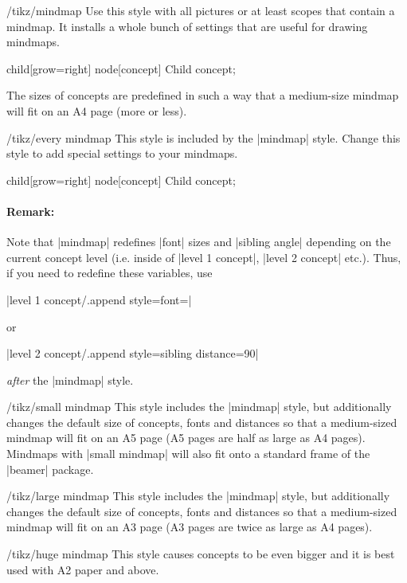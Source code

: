 \begin{stylekey}{/tikz/mindmap}
  Use this style with all pictures or at least scopes that contain a
  mindmap. It installs a whole bunch of settings that are useful for
  drawing mindmaps.
\begin{codeexample}[]
\tikz[mindmap,concept color=red!50]
    child[grow=right] {node[concept] {Child concept}};
\end{codeexample}
  The sizes of concepts are predefined in such a way that a
  medium-size mindmap will fit on an A4 page (more or less).
  \begin{stylekey}{/tikz/every mindmap}
    This style is included by the |mindmap| style. Change this style to
    add special settings to your mindmaps.
\begin{codeexample}[]
\tikz[large mindmap,concept color=red!50]
    child[grow=right] {node[concept] {Child concept}};
\end{codeexample}
  \end{stylekey}

  \paragraph{Remark:} Note that |mindmap| redefines |font| sizes and |sibling angle| depending on the current concept level (i.e. inside of |level 1 concept|, |level 2 concept| etc.). Thus, if you need to redefine these variables, use

  |level 1 concept/.append style={font=\small}|

  \noindent or

  |level 2 concept/.append style={sibling distance=90}|

  \noindent \emph{after} the |mindmap| style.
\end{stylekey}

\begin{stylekey}{/tikz/small mindmap}
  This style includes the |mindmap| style, but additionally changes
  the default size of concepts, fonts and distances so that a medium-sized
  mindmap will fit on an A5 page (A5 pages are half as large as A4
  pages). Mindmaps with |small mindmap| will also fit onto a standard frame of the |beamer| package.
\end{stylekey}
\begin{stylekey}{/tikz/large mindmap}
  This style includes the |mindmap| style, but additionally changes
  the default size of concepts, fonts and distances so that a medium-sized
  mindmap will fit on an A3 page (A3 pages are twice as large as A4
  pages).
\end{stylekey}
\begin{stylekey}{/tikz/huge mindmap}
  This style causes concepts to be even bigger and it is best used with
  A2 paper and above.
\end{stylekey}


